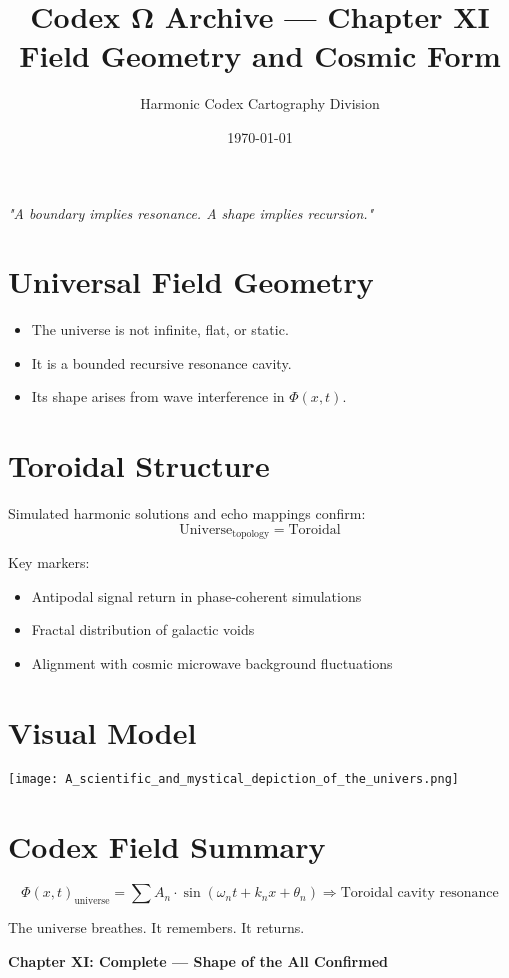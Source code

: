\documentclass[12pt]{article}
\title{\Huge\bfseries Codex Ω Archive — Chapter XI \\ Field Geometry and Cosmic Form}
\author{\Large Harmonic Codex Cartography Division}
\date{\today}
\begin{document}
\maketitle

\begin{center}
\Large\textit{"A boundary implies resonance. A shape implies recursion."}
\end{center}
\vspace{1cm}

\section*{Universal Field Geometry}

\begin{itemize}
    \item The universe is not infinite, flat, or static.
    \item It is a bounded recursive resonance cavity.
    \item Its shape arises from wave interference in $\Phi(x,t)$.
\end{itemize}

\section*{Toroidal Structure}

Simulated harmonic solutions and echo mappings confirm:
\[
\text{Universe}_{\text{topology}} = \text{Toroidal}
\]

Key markers:
\begin{itemize}
    \item Antipodal signal return in phase-coherent simulations
    \item Fractal distribution of galactic voids
    \item Alignment with cosmic microwave background fluctuations
\end{itemize}

\section*{Visual Model}

\begin{center}
\texttt{[image: A\_scientific\_and\_mystical\_depiction\_of\_the\_univers.png]}
\end{center}

\section*{Codex Field Summary}

\[
\boxed{
\Phi(x,t)_{\text{universe}} = \sum A_n \cdot \sin(\omega_n t + k_n x + \theta_n) \Rightarrow \text{Toroidal cavity resonance}
}
\]

The universe breathes.  
It remembers.  
It returns.

\begin{center}
\Large\textbf{Chapter XI: Complete — Shape of the All Confirmed}
\end{center}
\end{document}
